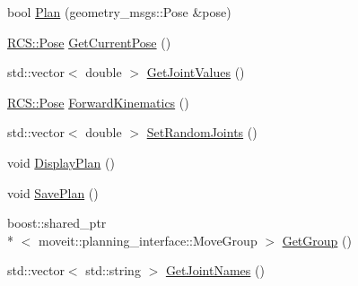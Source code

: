 \begin{DoxyCompactItemize}
\item 
bool \hyperlink{classMoveitPlanning_ac0e53ee15cf0ac2f605422534963d78e}{Plan} (geometry\-\_\-msgs\-::\-Pose \&pose)
\item 
\hyperlink{namespaceRCS_aa07e45d8a50e30064283d2b38087f999}{R\-C\-S\-::\-Pose} \hyperlink{classMoveitPlanning_a44786615bc6798f29575d5846078c881}{Get\-Current\-Pose} ()
\item 
std\-::vector$<$ double $>$ \hyperlink{classMoveitPlanning_a4ad173a662340daf91ab2ddde44e0946}{Get\-Joint\-Values} ()
\item 
\hyperlink{namespaceRCS_aa07e45d8a50e30064283d2b38087f999}{R\-C\-S\-::\-Pose} \hyperlink{classMoveitPlanning_a9eb93f8c0456c80bd07ebc57e5c90d32}{Forward\-Kinematics} ()
\item 
std\-::vector$<$ double $>$ \hyperlink{classMoveitPlanning_a8e98e6c54141fc0a3ef92cfcef7bcfa5}{Set\-Random\-Joints} ()
\item 
void \hyperlink{classMoveitPlanning_abe8bbc034b09c7935ee2a54d557fb5c8}{Display\-Plan} ()
\item 
void \hyperlink{classMoveitPlanning_a99ae8ab8c7047f95d114701f1f3f2a49}{Save\-Plan} ()
\item 
boost\-::shared\-\_\-ptr\\*
$<$ moveit\-::planning\-\_\-interface\-::\-Move\-Group $>$ \hyperlink{classMoveitPlanning_ae8754bf6b519a2fc6ada11a44989479b}{Get\-Group} ()
\item 
std\-::vector$<$ std\-::string $>$ \hyperlink{classMoveitPlanning_a26149b824c249979b28fcb46d4909668}{Get\-Joint\-Names} ()
\end{DoxyCompactItemize}
